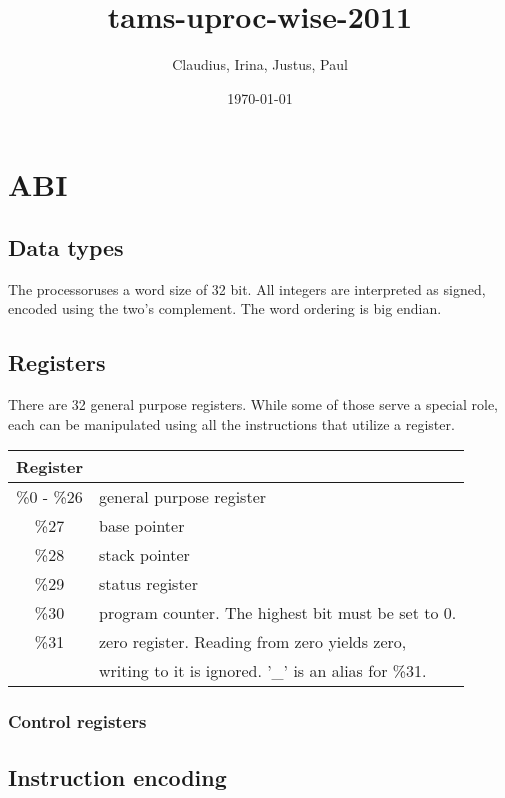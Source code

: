 \documentclass{article}
\author{Claudius, Irina, Justus, Paul}
\title{\cpu\\
tams-uproc-wise-2011}
\date{\today}
\newcommand{\cpu}{processor}
\begin{document}
\maketitle
\tableofcontents

\section{ABI}

\subsection{Data types}

The \cpu uses a word size of 32 bit. All integers are interpreted as
signed, encoded using the two's complement. The word ordering is big
endian.

\subsection{Registers}

There are 32 general purpose registers. While some of those serve a
special role, each can be manipulated using all the instructions that
utilize a register.

\begin{center}
  \begin{tabular}{c|l}
    Register & \\
    \hline
    \%0 - \%26 & general purpose register \\
    \%27         & base pointer \\
    \%28         & stack pointer \\
    \%29         & status register \\
    \%30         & program counter. The highest bit must be set to 0. \\
    \%31         & zero register. Reading from zero yields zero, \\
    & writing to it is ignored. '\_' is an alias for \%31. \\
  \end{tabular}
\end{center}

\subsubsection{Control registers}

\subsection{Instruction encoding}
\end{document}
